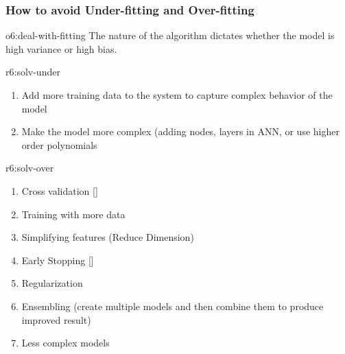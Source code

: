 \documentclass{tron}
\begin{document}
\clearpage
\subsubsection{How to avoid Under-fitting and Over-fitting}
\begin{overview}{o6:deal-with-fitting}
	The nature of the algorithm dictates whether the model is high variance or high bias.
	
	\begin{remark}{r6:solv-under}
		\begin{enumerate}
			\item Add more training data to the system to capture complex behavior of the model
			\item Make the model more complex (adding nodes, layers in \Gls{ANN}, or use higher order polynomials
		\end{enumerate}
	\end{remark}
	\begin{remark}{r6:solv-over}
		\begin{enumerate}
			\item Cross validation []
			\item Training with more data
			\item Simplifying features (Reduce Dimension)
			\item Early Stopping []
			\item Regularization
			\item Ensembling (create multiple models and then combine them to produce improved result)
			\item Less complex models
		\end{enumerate}
	\end{remark}
\end{overview}
\end{document}
